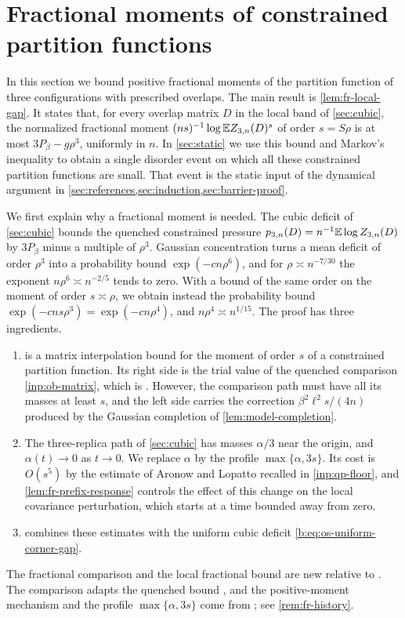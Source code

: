 \chapter{Fractional moments of constrained partition functions}\label{sec:fractional}\label{b:sec:fractional-static}

In this section we bound positive fractional moments of the partition function of three configurations with prescribed overlaps. The main result is \cref{lem:fr-local-gap}. It states that, for every overlap matrix $D$ in the local band of \cref{sec:cubic}, the normalized fractional moment $(ns)^{-1}\log\mathbb E Z_{3,n}(D)^s$ of order $s=S\rho$ is at most $3P_\beta-g\rho^3$, uniformly in $n$. In \cref{sec:static} we use this bound and Markov's inequality to obtain a single disorder event on which all these constrained partition functions are small. That event is the static input of the dynamical argument in \cref{sec:references,sec:induction,sec:barrier-proof}.

We first explain why a fractional moment is needed. The cubic deficit of \cref{sec:cubic} bounds the quenched constrained pressure $p_{3,n}(D)=n^{-1}\mathbb E\log Z_{3,n}(D)$ by $3P_\beta$ minus a multiple of $\rho^3$. Gaussian concentration turns a mean deficit of order $\rho^3$ into a probability bound $\exp(-cn\rho^6)$, and for $\rho\asymp n^{-7/30}$ the exponent $n\rho^6\asymp n^{-2/5}$ tends to zero. With a bound of the same order on the moment of order $s\asymp\rho$, we obtain instead the probability bound $\exp(-cns\rho^3)=\exp(-cn\rho^4)$, and $n\rho^4\asymp n^{1/15}$. The proof has three ingredients.
\begin{enumerate}
\item {} is a matrix interpolation bound for the moment of order $s$ of a constrained partition function. Its right side is the trial value of the quenched comparison \cref{inp:ob-matrix}, which is \cite[Proposition~2.3]{oai-barriers}. However, the comparison path must have all its masses at least $s$, and the left side carries the correction $\beta^2\ell^2s/(4n)$ produced by the Gaussian completion of \cref{lem:model-completion}.
\item The three-replica path of \cref{sec:cubic} has masses $\alpha/3$ near the origin, and $\alpha(t)\to0$ as $t\to0$. We replace $\alpha$ by the profile $\max\{\alpha,3s\}$. Its cost is $O(s^5)$ by the estimate of Aronow and Lopatto recalled in \cref{inp:qp-floor}, and \cref{lem:fr-prefix-response} controls the effect of this change on the local covariance perturbation, which starts at a time bounded away from zero.
\item {} combines these estimates with the uniform cubic deficit \eqref{b:eq:os-uniform-corner-gap}.
\end{enumerate}
The fractional comparison and the local fractional bound are new relative to \cite{oai-barriers}. The comparison adapts the quenched bound \cite[Proposition~2.3]{oai-barriers}, and the positive-moment mechanism and the profile $\max\{\alpha,3s\}$ come from \cite{quantitative-parisi}; see \cref{rem:fr-history}.

